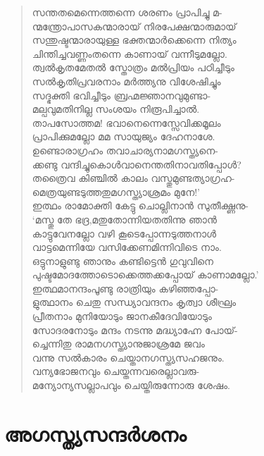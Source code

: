 \begin{verse}
സന്തതമെന്നെത്തന്നെ ശരണം പ്രാപിച്ചു മ-\\
ന്മന്ത്രോപാസകന്മാരായ് നിരപേക്ഷന്മാരുമായ്\\
സന്തുഷ്ടന്മാരായുള്ള ഭക്തന്മാര്‍ക്കെന്നെ നിത്യം\\
ചിന്തിച്ചവണ്ണംതന്നെ കാണായ് വന്നീടുമല്ലോ.\\
ത്വല്‍കൃതമേതല്‍ സ്തോത്രം മല്‍പ്രിയം പഠിച്ചീടും\\
സല്‍കൃതിപ്രവരനാം മര്‍ത്ത്യനു വിശേഷിച്ചും\\
സദ്ഭക്തി ഭവിച്ചീടും ബ്രഹ്മജ്ഞാനവുമുണ്ടാ-\\
മല്പവുമതിനില്ല സംശയം നിരൂപിച്ചാല്‍.\\
താപസോത്തമ! ഭവാനെന്നെസ്സേവിക്കമൂലം\\
പ്രാപിക്കുമല്ലോ മമ സായുജ്യം ദേഹനാശേ.\\
ഉണ്ടൊരാഗ്രഹം തവാചാര്യനാമഗസ്ത്യനെ-\\
ക്കണ്ടു വന്ദിച്ചുകൊള്‍വാനെന്തതിനാവതിപ്പോള്‍?\\
തത്രൈവ കിഞ്ചില്‍ കാലം വസ്തുമുണ്ടത്യാഗ്രഹ-\\
മെത്രയുണ്ടടുത്തതുമഗസ്ത്യാശ്രമം മുനേ!’\\
ഇത്ഥം രാമോക്തി കേട്ടു ചൊല്ലിനാന്‍ സുതീക്ഷ്ണനു-\\
‘മസ്തു തേ ഭദ്ര,മതുതോന്നിയതതിന്നു ഞാന്‍\\
കാട്ടുവേനല്ലോ വഴി കൂടെപ്പോന്നടുത്തനാള്‍\\
വാട്ടമെന്നിയേ വസിക്കേണമിന്നിവിടെ നാം.\\
ഒട്ടുനാളുണ്ടു ഞാനും കണ്ടിട്ടെന്‍ ഗുവുവിനെ\\
പുഷ്ടമോദത്തോടൊക്കെത്തക്കപ്പോയ് കാണാമല്ലോ.’\\
ഇത്ഥമാനന്ദംപൂണ്ടു രാത്രിയും കഴിഞ്ഞപ്പോ-\\
ളുത്ഥാനം ചെതു സന്ധ്യാവന്ദനം കൃത്വാ ശീഘ്രം\\
പ്രീതനാം മുനിയോടും ജാനകീദേവിയോടും\\
സോദരനോടും മന്ദം നടന്നു മദ്ധ്യാഹ്നേ പോയ്-\\
ച്ചെന്നിതു രാമനഗസ്ത്യാനുജാശ്രമേ ജവം\\
വന്നു സല്‍കാരം ചെയ്താനഗസ്ത്യസഹജനും.\\
വന്യഭോജനവും ചെയ്തന്നവരെല്ലാവരു-\\
മന്യോന്യസല്ലാപവും ചെയ്തിരുന്നോരു ശേഷം.
\end{verse}

\section{അഗസ്ത്യസന്ദര്‍ശനം}

